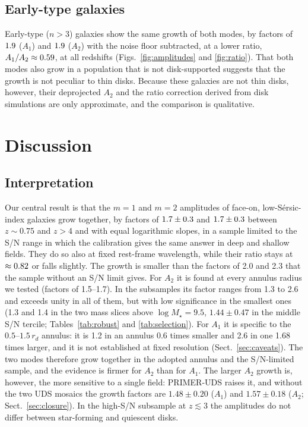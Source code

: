 \documentclass[fleqn,usenatbib]{mnras}
\newcommand{\Mstar}{M_\star}
\begin{document}
\subsection{Early-type galaxies}\label{sec:early}

Early-type ($n>3$) galaxies show the same growth of both modes, by factors of
$1.9$ ($A_1$) and $1.9$ ($A_2$) with the noise floor
subtracted, at a lower ratio, $A_1/A_2\approx0.59$, at all redshifts
(Figs.~\ref{fig:amplitudes} and \ref{fig:ratio}). That both modes also grow in a
population that is not disk-supported suggests that the growth is not peculiar
to thin disks. Because these galaxies are not thin disks, however, their
deprojected $A_2$ and the ratio correction derived from disk simulations are only
approximate, and the comparison is qualitative.

\section{Discussion}\label{sec:discussion}

\subsection{Interpretation}\label{sec:interpretation}

Our central result is that the $m=1$ and $m=2$ amplitudes of face-on,
low-S\'ersic-index galaxies grow together, by factors of $1.7\pm0.3$
and $1.7\pm0.3$ between $z\sim0.75$ and $z>4$ and with equal
logarithmic slopes, in a sample limited to the S/N range in which the calibration
gives the same answer in deep and shallow fields. They do so also at fixed
rest-frame wavelength, while their ratio stays at $\approx0.82$ or falls
slightly. The growth is smaller than the factors of 2.0 and 2.3 that the sample
without an S/N limit gives. For $A_2$ it is found at every annulus radius we
tested (factors of 1.5--1.7). In the subsamples its factor ranges from 1.3 to
2.6 and exceeds unity in all of them, but with low significance in the smallest
ones (1.3 and 1.4 in the two mass slices above $\log\Mstar=9.5$,
$1.44\pm0.47$ in the middle S/N tercile; Tables~\ref{tab:robust} and
\ref{tab:selection}). For $A_1$ it is specific to the
$0.5$--$1.5\,r_d$ annulus: it is 1.2 in an annulus 0.6 times smaller and 2.6 in
one 1.68 times larger, and it is not established at fixed resolution
(Sect.~\ref{sec:caveats}). The two modes therefore grow together in the adopted
annulus and the S/N-limited sample, and the evidence is firmer for $A_2$ than
for $A_1$. The larger $A_2$ growth is, however, the more sensitive to a single
field: PRIMER-UDS raises it, and without the two UDS mosaics the growth factors
are $1.48\pm0.20$ ($A_1$) and $1.57\pm0.18$ ($A_2$; Sect.~\ref{sec:closure}).
In the high-S/N subsample at $z\lesssim3$
the amplitudes do not differ between star-forming and quiescent disks.
\end{document}

